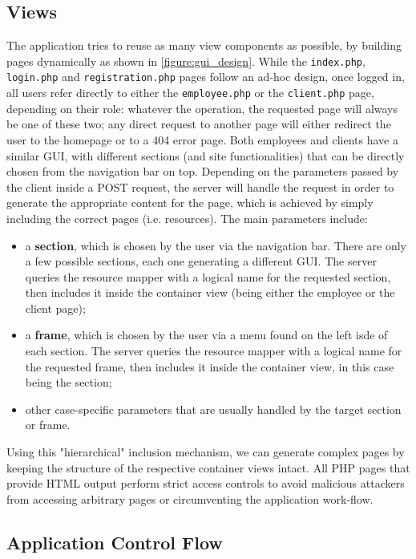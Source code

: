 \subsection{Views}
The application tries to reuse as many view components as possible, by building pages dynamically as shown in \autoref{figure:gui_design}. 
While the \texttt{index.php}, \texttt{login.php} and \texttt{registration.php} pages follow an ad-hoc design, once logged in, all users refer directly to either the \texttt{employee.php} or the \texttt{client.php} page, depending on their role: whatever the operation, the requested page will always be one of these two; any direct request to another page will either redirect the user to the homepage or to a 404 error page. Both employees and clients have a similar GUI, with different sections (and site functionalities) that can be directly chosen from the navigation bar on top.\newline
Depending on the parameters passed by the client inside a POST request, the server will handle the request in order to generate the appropriate content for the page, which is achieved by simply including the correct pages (i.e. resources). The main parameters include:
\begin{itemize}
	\item a \textbf{section}, which is chosen by the user via the navigation bar. There are only a few possible sections, each one generating a different GUI. The server queries the resource mapper with a logical name for the requested section, then includes it inside the container view (being either the employee or the client page);
	\item a \textbf{frame}, which is chosen by the user via a menu found on the left isde of each section. The server queries the resource mapper with a logical name for the requested frame, then includes it inside the container view, in this case being the section;
	\item other case-specific parameters that are usually handled by the target section or frame.
\end{itemize}
Using this "hierarchical" inclusion mechanism, we can generate complex pages by keeping the structure of the respective container views intact.
All PHP pages that provide HTML output perform strict access controls to avoid malicious attackers from accessing arbitrary pages or circumventing the application work-flow.

\subsection{Application Control Flow}


